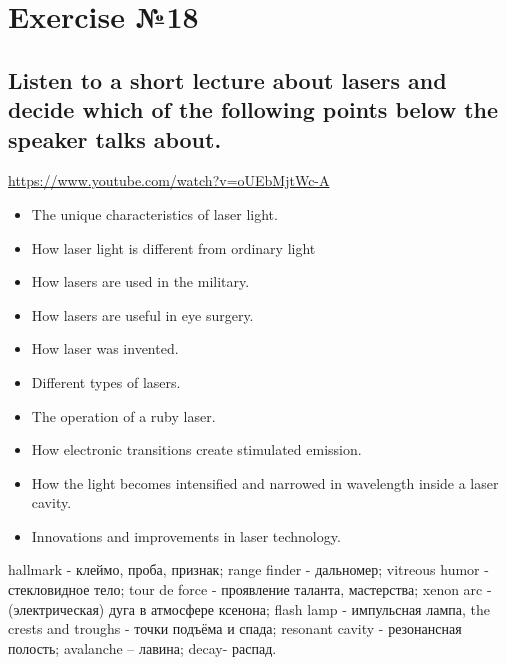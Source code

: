 \section{Exercise №18}
\subsection*{Listen to a short lecture about lasers and decide which of the following
      points below the speaker talks about.}

\href{https://www.youtube.com/watch?v=oUEbMjtWc-A}{https://www.youtube.com/watch?v=oUEbMjtWc-A}

\begin{itemize}
      \item The unique characteristics of laser light.
      \item How laser light is different from ordinary light
      \item How lasers are used in the military.
      \item How lasers are useful in eye surgery.
      \item How laser was invented.
      \item Different types of lasers.
      \item The operation of a ruby laser.
      \item How electronic transitions create stimulated emission.
      \item How the light becomes intensified and narrowed in wavelength inside a laser
            cavity.
      \item Innovations and improvements in laser technology.
\end{itemize}

 hallmark - клеймо, проба, признак; range finder - дальномер;
vitreous humor - стекловидное тело; tour de force - проявление таланта, мастерства;
xenon arc - (электрическая) дуга в атмосфере ксенона; flash lamp - импульсная лампа,
the crests and troughs - точки подъёма и спада; resonant cavity - резонансная полость;
avalanche – лавина; decay- распад.

